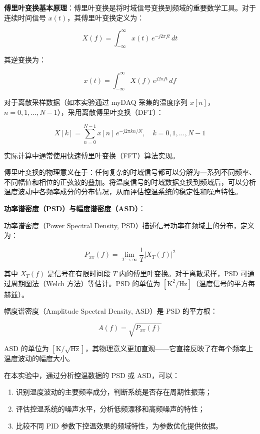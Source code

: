 \documentclass[dvipsnames, svgnames,a4paper,11pt]{article}
\begin{document}
\textbf{傅里叶变换基本原理}：傅里叶变换是将时域信号变换到频域的重要数学工具。对于连续时间信号 $x(t)$，其傅里叶变换定义为：

\begin{equation}\label{eq:ft}
    X(f) = \int_{-\infty}^{\infty} x(t)\, e^{-j2\pi f t}\, dt
\end{equation}

其逆变换为：

\begin{equation}\label{eq:ift}
    x(t) = \int_{-\infty}^{\infty} X(f)\, e^{j2\pi f t}\, df
\end{equation}

对于离散采样数据（如本实验通过 myDAQ 采集的温度序列 $x[n]$，$n=0,1,\dots,N-1$），采用离散傅里叶变换（DFT）：

\begin{equation}\label{eq:dft}
    X[k] = \sum_{n=0}^{N-1} x[n]\, e^{-j2\pi k n / N}, \quad k = 0,1,\dots,N-1
\end{equation}

实际计算中通常使用快速傅里叶变换（FFT）算法实现。

傅里叶变换的物理意义在于：任何复杂的时域信号都可以分解为一系列不同频率、不同幅值和相位的正弦波的叠加。将温度信号的时域数据变换到频域后，可以分析温度波动中各频率成分的分布情况，从而评估控温系统的稳定性和噪声特性。

\textbf{功率谱密度（PSD）与幅度谱密度（ASD）}：

功率谱密度（Power Spectral Density, PSD）描述信号功率在频域上的分布，定义为：

\begin{equation}\label{eq:psd}
    P_{\!xx}(f) = \lim_{T \to \infty} \frac{1}{T} \left| X_T(f) \right|^2
\end{equation}

其中 $X_T(f)$ 是信号在有限时间段 $T$ 内的傅里叶变换。对于离散采样，PSD 可通过周期图法（Welch 方法）等估计。PSD 的单位为 $[\text{K}^2/\text{Hz}]$（温度信号的平方每赫兹）。

幅度谱密度（Amplitude Spectral Density, ASD）是 PSD 的平方根：

\begin{equation}\label{eq:asd}
    A(f) = \sqrt{P_{\!xx}(f)}
\end{equation}

ASD 的单位为 $[\text{K}/\sqrt{\text{Hz}}]$，其物理意义更加直观——它直接反映了在每个频率上温度波动的幅度大小。

在本实验中，通过分析控温数据的 PSD 或 ASD，可以：
\begin{enumerate}
    \item 识别温度波动的主要频率成分，判断系统是否存在周期性振荡；
    \item 评估控温系统的噪声水平，分析低频漂移和高频噪声的特性；
    \item 比较不同 PID 参数下控温效果的频域特性，为参数优化提供依据。
\end{enumerate}
\end{document}
